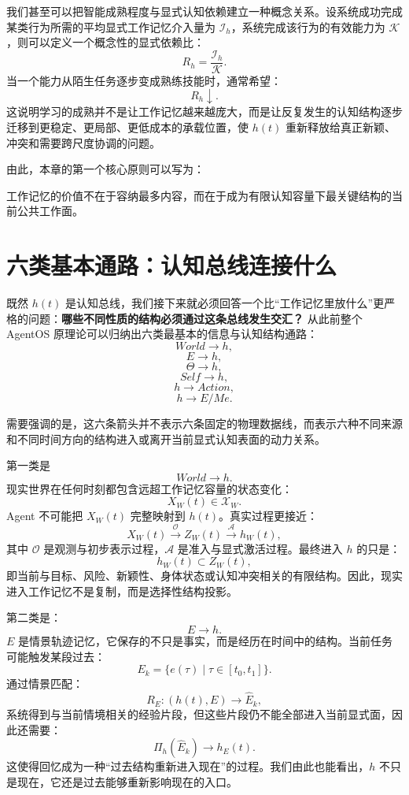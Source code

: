 我们甚至可以把智能成熟程度与显式认知依赖建立一种概念关系。设系统成功完成某类行为所需的平均显式工作记忆介入量为 $\mathcal I_h$，系统完成该行为的有效能力为 $\mathcal K$，则可以定义一个概念性的显式依赖比：
\[
R_h
=
\frac{\mathcal I_h}{\mathcal K}.
\]
当一个能力从陌生任务逐步变成熟练技能时，通常希望：
\[
R_h\downarrow.
\]
这说明学习的成熟并不是让工作记忆越来越庞大，而是让反复发生的认知结构逐步迁移到更稳定、更局部、更低成本的承载位置，使 $h(t)$ 重新释放给真正新颖、冲突和需要跨尺度协调的问题。

由此，本章的第一个核心原则可以写为：
\begin{proposition*}
工作记忆的价值不在于容纳最多内容，而在于成为有限认知容量下最关键结构的当前公共工作面。
\end{proposition*}

\section{六类基本通路：认知总线连接什么}

既然 $h(t)$ 是认知总线，我们接下来就必须回答一个比“工作记忆里放什么”更严格的问题：\textbf{哪些不同性质的结构必须通过这条总线发生交汇？} 从此前整个 AgentOS 原理论可以归纳出六类最基本的信息与认知结构通路：
\[
World\rightarrow h,
\]
\[
E\rightarrow h,
\]
\[
\Theta\rightarrow h,
\]
\[
Self\rightarrow h,
\]
\[
h\rightarrow Action,
\]
\[
h\rightarrow E/Me.
\]

需要强调的是，这六条箭头并不表示六条固定的物理数据线，而表示六种不同来源和不同时间方向的结构进入或离开当前显式认知表面的动力关系。

第一类是
\[
World\rightarrow h.
\]
现实世界在任何时刻都包含远超工作记忆容量的状态变化：
\[
X_W(t)\in\mathcal X_W.
\]
Agent 不可能把 $X_W(t)$ 完整映射到 $h(t)$。真实过程更接近：
\[
X_W(t)
\xrightarrow{\mathcal O}
Z_W(t)
\xrightarrow{\mathcal A}
h_W(t),
\]
其中 $\mathcal O$ 是观测与初步表示过程，$\mathcal A$ 是准入与显式激活过程。最终进入 $h$ 的只是：
\[
h_W(t)\subset Z_W(t),
\]
即当前与目标、风险、新颖性、身体状态或认知冲突相关的有限结构。因此，现实进入工作记忆不是复制，而是选择性结构投影。

第二类是：
\[
E\rightarrow h.
\]
$E$ 是情景轨迹记忆，它保存的不只是事实，而是经历在时间中的结构。当前任务可能触发某段过去：
\[
E_k
=
\{e(\tau)\mid \tau\in[t_0,t_1]\}.
\]
通过情景匹配：
\[
R_E:
(h(t),E)\rightarrow \hat E_k,
\]
系统得到与当前情境相关的经验片段，但这些片段仍不能全部进入当前显式面，因此还需要：
\[
\Pi_h(\hat E_k)
\rightarrow h_E(t).
\]
这使得回忆成为一种“过去结构重新进入现在”的过程。我们由此也能看出，$h$ 不只是现在，它还是过去能够重新影响现在的入口。

